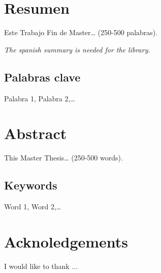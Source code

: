  \setcounter{page}{1}
\chapter*{Resumen}
Este Trabajo Fin de Master… (250-500 palabras). 

\emph{The spanish summary is needed for the library.}

\vfill
\section*{Palabras clave}
Palabra 1, Palabra 2,…

\newpage
\chapter*{Abstract}
This Master Thesis… (250-500 words).

\vfill
\section*{Keywords}
Word 1, Word 2,…

\newpage
\chapter*{Acknoledgements}
I would like to thank ...